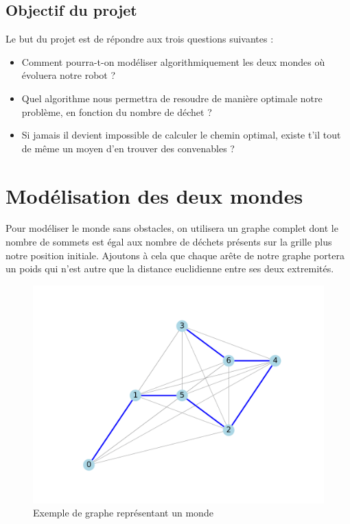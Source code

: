 \documentclass{article}
\begin{document}
\subsection{ Objectif du projet}
\hspace{0,5cm} Le but du projet est de r\'epondre aux trois questions suivantes : \\
\hspace{1 cm} 
\begin{itemize}
\item Comment pourra-t-on mod\'eliser algorithmiquement les deux mondes o\`u \'evoluera notre robot ?
\item Quel algorithme nous permettra de resoudre de mani\`ere optimale notre probl\`eme, en fonction du nombre de déchet ?
\item Si jamais il devient impossible de calculer le chemin optimal, existe t'il tout de même un moyen d'en trouver des convenables ?
\end{itemize}

\section{ Mod\'elisation des deux mondes}
\hspace{0,5 cm}  Pour mod\'eliser le monde sans obstacles, on utilisera un graphe complet dont le nombre de sommets est \'egal aux nombre de d\'echets pr\'esents sur la grille plus notre 
position initiale. Ajoutons \`a cela que chaque ar\^ete de notre graphe portera un poids qui n'est autre que la distance euclidienne entre ses deux extremit\'es.

\begin{figure}[!h]
    \centerline{\includegraphics[scale=1]{best_path_arbitrary-1.png}}
    \caption{Exemple de graphe repr\'esentant un monde} 
  \end{figure}
\end{document}
